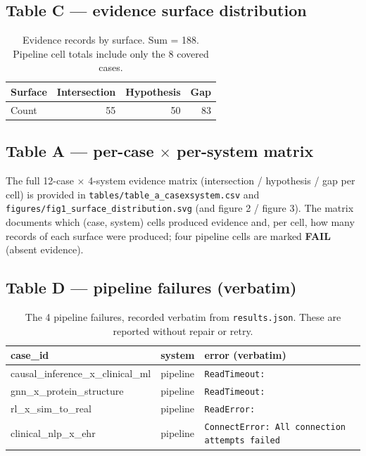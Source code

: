 \documentclass[11pt]{article}
\begin{document}
\subsection{Table C --- evidence surface distribution}
\begin{table}[h]
\centering
\begin{tabular}{lrrr}
\toprule
\textbf{Surface} & \textbf{Intersection} & \textbf{Hypothesis} & \textbf{Gap}\\
\midrule
Count & 55 & 50 & 83 \\
\bottomrule
\end{tabular}
\caption{Evidence records by surface. Sum = 188. Pipeline cell totals include
only the 8 covered cases.}
\label{tab:c}
\end{table}

\subsection{Table A --- per-case $\times$ per-system matrix}
The full 12-case $\times$ 4-system evidence matrix (intersection / hypothesis /
gap per cell) is provided in \texttt{tables/table\_a\_casexsystem.csv} and
\texttt{figures/fig1\_surface\_distribution.svg} (and figure 2 / figure 3). The
matrix documents which (case, system) cells produced evidence and, per cell,
how many records of each surface were produced; four pipeline cells are marked
\textbf{FAIL} (absent evidence).

\subsection{Table D --- pipeline failures (verbatim)}
\begin{table}[h]
\centering
\begin{tabular}{lll}
\toprule
\textbf{case\_id} & \textbf{system} & \textbf{error (verbatim)} \\
\midrule
causal\_inference\_x\_clinical\_ml & pipeline & \texttt{ReadTimeout: } \\
gnn\_x\_protein\_structure & pipeline & \texttt{ReadTimeout: } \\
rl\_x\_sim\_to\_real & pipeline & \texttt{ReadError: } \\
clinical\_nlp\_x\_ehr & pipeline & \texttt{ConnectError: All connection attempts failed} \\
\bottomrule
\end{tabular}
\caption{The 4 pipeline failures, recorded verbatim from
\texttt{results.json}. These are reported without repair or retry.}
\label{tab:d}
\end{table}
\end{document}
